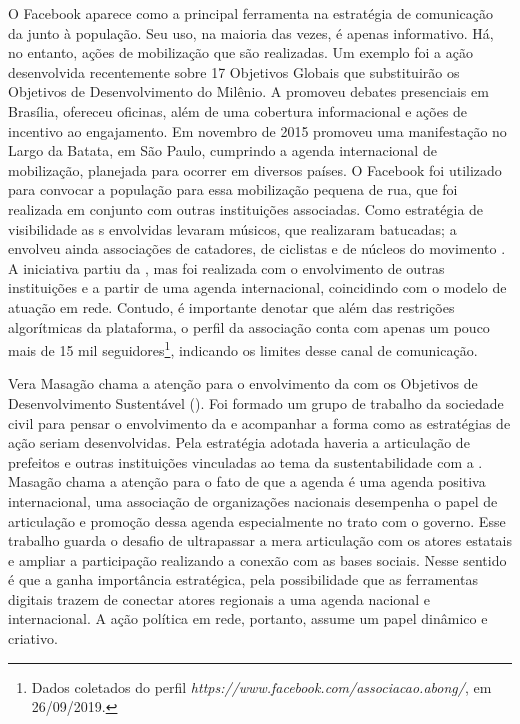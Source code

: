 O Facebook aparece como a principal ferramenta na estratégia de
comunicação da  junto à população. Seu uso, na maioria das vezes, é
apenas informativo. Há, no entanto, ações de mobilização que são
realizadas. Um exemplo foi a ação desenvolvida recentemente sobre 17
Objetivos Globais que substituirão os Objetivos de Desenvolvimento do
Milênio. A  promoveu debates presenciais em Brasília, ofereceu
oficinas, além de uma cobertura informacional e ações de incentivo ao
engajamento. Em novembro de 2015 promoveu uma manifestação no Largo da
Batata, em São Paulo, cumprindo a agenda internacional de mobilização,
planejada para ocorrer em diversos países. O Facebook foi utilizado para
convocar a população para essa mobilização pequena de rua, que foi
realizada em conjunto com outras instituições associadas. Como
estratégia de visibilidade as s envolvidas levaram músicos, que
realizaram batucadas; a  envolveu ainda associações de catadores,
de ciclistas e de núcleos do movimento . A iniciativa partiu da
, mas foi realizada com o envolvimento de outras instituições e a
partir de uma agenda internacional, coincidindo com o modelo de atuação
em rede. Contudo, é importante denotar que além das restrições
algorítmicas da plataforma, o perfil da associação conta com apenas um
pouco mais de 15 mil seguidores\footnote{Dados coletados do perfil
  \emph{https://www.facebook.com/associacao.abong/},
  em 26/09/2019.}, indicando os limites desse canal de comunicação.

Vera Masagão chama a atenção para o envolvimento da  com os
Objetivos de Desenvolvimento Sustentável (). Foi formado um grupo de
trabalho da sociedade civil para pensar o envolvimento da  e
acompanhar a forma como as estratégias de ação seriam desenvolvidas.
Pela estratégia adotada haveria a articulação de prefeitos e outras
instituições vinculadas ao tema da sustentabilidade com a . Masagão
chama a atenção para o fato de que a agenda  é uma agenda positiva
internacional, uma associação de organizações nacionais desempenha o
papel de articulação e promoção dessa agenda especialmente no trato com
o governo. Esse trabalho guarda o desafio de ultrapassar a mera
articulação com os atores estatais e ampliar a participação realizando a
conexão com as bases sociais. Nesse sentido é que a  ganha
importância estratégica, pela possibilidade que as ferramentas digitais
trazem de conectar atores regionais a uma agenda nacional e
internacional. A ação política em rede, portanto, assume um papel
dinâmico e criativo.

